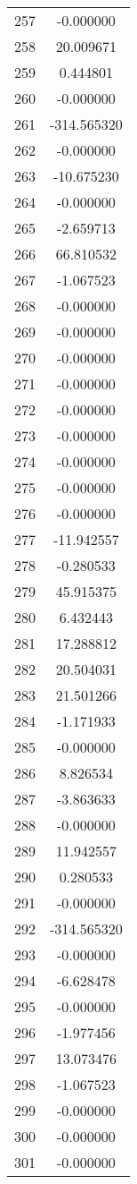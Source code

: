 \documentclass[12pt]{article}
\begin{document}
\begin{longtable}{@{}cc@{}}
257 & -0.000000 \\
258 & 20.009671 \\
259 & 0.444801 \\
260 & -0.000000 \\
261 & -314.565320 \\
262 & -0.000000 \\
263 & -10.675230 \\
264 & -0.000000 \\
265 & -2.659713 \\
266 & 66.810532 \\
267 & -1.067523 \\
268 & -0.000000 \\
269 & -0.000000 \\
270 & -0.000000 \\
271 & -0.000000 \\
272 & -0.000000 \\
273 & -0.000000 \\
274 & -0.000000 \\
275 & -0.000000 \\
276 & -0.000000 \\
277 & -11.942557 \\
278 & -0.280533 \\
279 & 45.915375 \\
280 & 6.432443 \\
281 & 17.288812 \\
282 & 20.504031 \\
283 & 21.501266 \\
284 & -1.171933 \\
285 & -0.000000 \\
286 & 8.826534 \\
287 & -3.863633 \\
288 & -0.000000 \\
289 & 11.942557 \\
290 & 0.280533 \\
291 & -0.000000 \\
292 & -314.565320 \\
293 & -0.000000 \\
294 & -6.628478 \\
295 & -0.000000 \\
296 & -1.977456 \\
297 & 13.073476 \\
298 & -1.067523 \\
299 & -0.000000 \\
300 & -0.000000 \\
301 & -0.000000 \\

\end{longtable}
\end{document}

